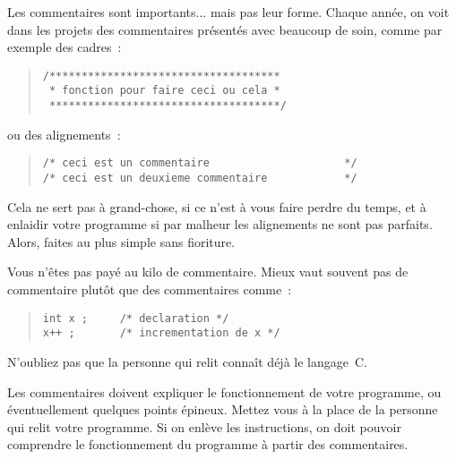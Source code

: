 Les commentaires sont importants... mais pas leur forme. Chaque année,
on voit dans les projets des commentaires présentés avec beaucoup
de soin, comme par exemple des cadres~:

\begin {quote}
\begin {verbatim}
/************************************
 * fonction pour faire ceci ou cela *
 ************************************/
\end{verbatim}
\end {quote}

ou des alignements~:

\begin {quote}
\begin {verbatim}
/* ceci est un commentaire                     */
/* ceci est un deuxieme commentaire            */
\end{verbatim}
\end {quote}

Cela ne sert pas à grand-chose, si ce n'est à vous faire perdre du
temps, et à enlaidir votre programme si par malheur les alignements ne
sont pas parfaits. Alors, faites au plus simple sans fioriture.



Vous n'êtes pas payé au kilo de commentaire. Mieux vaut souvent pas
de commentaire plutôt que des commentaires comme~:

\begin {quote}
\begin {verbatim}
int x ;     /* declaration */
x++ ;       /* incrementation de x */
\end{verbatim}
\end {quote}

N'oubliez pas que la personne qui relit connaît déjà le langage~C.



Les commentaires doivent expliquer le fonctionnement de votre programme,
ou éventuellement quelques points épineux. Mettez vous à la place de la
personne qui relit votre programme.
Si on enlève les instructions, on doit pouvoir comprendre le fonctionnement
du programme à partir des commentaires.

